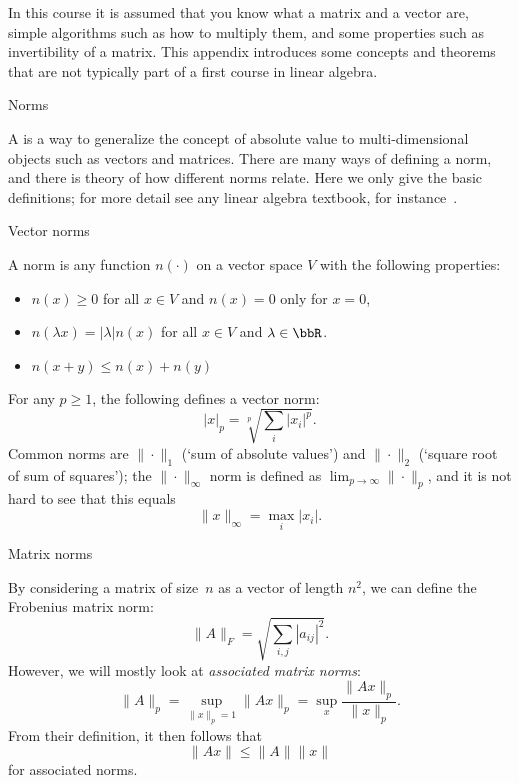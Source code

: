 
In this course it is assumed that you know what a matrix and a vector
are, simple algorithms such as how to multiply them, and some
properties such as invertibility of a matrix. This appendix introduces
some concepts and theorems that are not typically part of a first
course in linear algebra.

 {Norms}

A  is a way to generalize the concept of absolute
value to multi-dimensional objects such as vectors and matrices. There
are many ways of defining a norm, and there is theory of how different
norms relate. Here we only give the basic definitions; for more detail
see any linear algebra textbook, for instance~\cite{golo83}.

 {Vector norms}

A norm is any function $n(\cdot)$ on a vector space $V$ with the
following properties:
\begin{itemize}
\item $n(x)\geq0$ for all $x\in V$ and $n(x)=0$ only for $x=0$,
\item $n(\lambda x)=|\lambda|n(x)$ for all $x\in V$ and
  $\lambda\in\bbR$.
\item $n(x+y)\leq n(x)+n(y)$
\end{itemize}
For any $p\geq1$, the following defines a vector norm:
\[ |x|_p = \sqrt[p]{\sum_i|x_i|^p}. \]
Common norms are $\|\cdot\|_1$ (`sum of absolute values') and
$\|\cdot\|_2$ (`square root of sum of squares'); the
$\|\cdot\|_\infty$ norm is defined as
$\lim_{p\rightarrow\infty}\|\cdot\|_p$, and it is not hard to see that
this equals
\[ \|x\|_\infty=\max_i |x_i|. \]


 {Matrix norms}

By considering a matrix of size~$n$ as a vector of length $n^2$, we
can define the Frobenius matrix norm:
\[ \|A\|_F=\sqrt{\sum_{i,j}|a_{ij}|^2}. \]
However, we will mostly look at \emph{associated matrix
  norms}:
\[ \|A\|_p=\sup_{\|x\|_p=1}\|Ax\|_p=
   \sup_x\frac{\|Ax\|_p}{\|x\|_p}.
\]
From their definition, it then follows that 
\[ \|Ax\|\leq\|A\|\|x\| \]
for associated norms.


